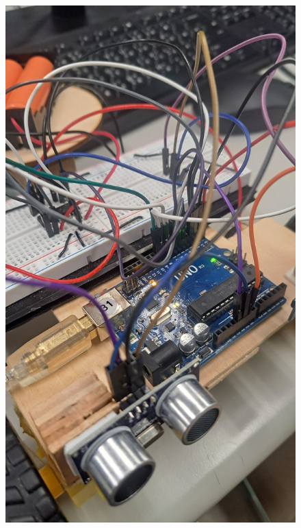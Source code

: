 \documentclass[a4paper,12pt]{article}
\begin{document}
\begin{center}\begin{figure}[H]\centering
\hfill
\begin{minipage}[t]{0.45\textwidth}
\centering
\includegraphics[width=\textwidth]{./photos/e.jpg}
\end{minipage}
\hfill
\begin{minipage}[t]{0.45\textwidth}
\centering

\end{minipage}
\end{figure}
\end{center}
\end{document}
